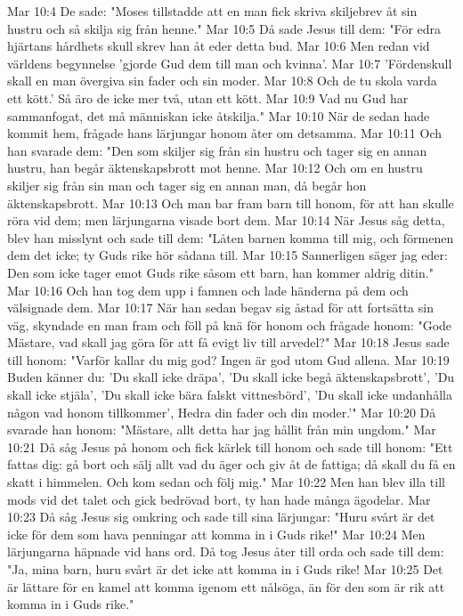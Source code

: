Mar 10:4  De sade: "Moses tillstadde att en man fick skriva skiljebrev åt sin hustru och så skilja sig från henne."
Mar 10:5  Då sade Jesus till dem: "För edra hjärtans hårdhets skull skrev han åt eder detta bud.
Mar 10:6  Men redan vid världens begynnelse 'gjorde Gud dem till man och kvinna'.
Mar 10:7  'Fördenskull skall en man övergiva sin fader och sin moder.
Mar 10:8  Och de tu skola varda ett kött.' Så äro de icke mer två, utan ett kött.
Mar 10:9  Vad nu Gud har sammanfogat, det må människan icke åtskilja."
Mar 10:10  När de sedan hade kommit hem, frågade hans lärjungar honom åter om detsamma.
Mar 10:11  Och han svarade dem: "Den som skiljer sig från sin hustru och tager sig en annan hustru, han begår äktenskapsbrott mot henne.
Mar 10:12  Och om en hustru skiljer sig från sin man och tager sig en annan man, då begår hon äktenskapsbrott.
Mar 10:13  Och man bar fram barn till honom, för att han skulle röra vid dem; men lärjungarna visade bort dem.
Mar 10:14  När Jesus såg detta, blev han misslynt och sade till dem: "Låten barnen komma till mig, och förmenen dem det icke; ty Guds rike hör sådana till.
Mar 10:15  Sannerligen säger jag eder: Den som icke tager emot Guds rike såsom ett barn, han kommer aldrig ditin."
Mar 10:16  Och han tog dem upp i famnen och lade händerna på dem och välsignade dem.
Mar 10:17  När han sedan begav sig åstad för att fortsätta sin väg, skyndade en man fram och föll på knä för honom och frågade honom: "Gode Mästare, vad skall jag göra för att få evigt liv till arvedel?"
Mar 10:18  Jesus sade till honom: "Varför kallar du mig god? Ingen är god utom Gud allena.
Mar 10:19  Buden känner du: 'Du skall icke dräpa', 'Du skall icke begå äktenskapsbrott', 'Du skall icke stjäla', 'Du skall icke bära falskt vittnesbörd', 'Du skall icke undanhålla någon vad honom tillkommer', Hedra din fader och din moder.'"
Mar 10:20  Då svarade han honom: "Mästare, allt detta har jag hållit från min ungdom."
Mar 10:21  Då såg Jesus på honom och fick kärlek till honom och sade till honom: "Ett fattas dig: gå bort och sälj allt vad du äger och giv åt de fattiga; då skall du få en skatt i himmelen. Och kom sedan och följ mig."
Mar 10:22  Men han blev illa till mods vid det talet och gick bedrövad bort, ty han hade många ägodelar.
Mar 10:23  Då såg Jesus sig omkring och sade till sina lärjungar: "Huru svårt är det icke för dem som hava penningar att komma in i Guds rike!"
Mar 10:24  Men lärjungarna häpnade vid hans ord. Då tog Jesus åter till orda och sade till dem: "Ja, mina barn, huru svårt är det icke att komma in i Guds rike!
Mar 10:25  Det är lättare för en kamel att komma igenom ett nålsöga, än för den som är rik att komma in i Guds rike."
